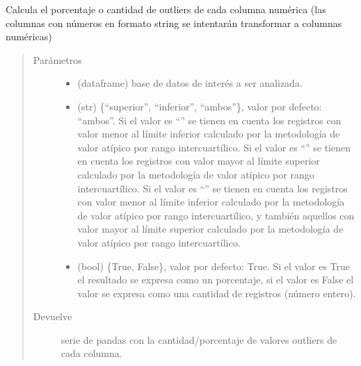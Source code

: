 \documentclass[letterpaper,10pt,openany,spanish]{sphinxmanual}
\begin{document}
\begin{fulllineitems}
\label{\detokenize{datos:datos.extremos}}
Calcula el porcentaje o cantidad de outliers de cada columna numérica (las columnas con números en formato string se intentarán transformar a columnas numéricas)
\begin{quote}\begin{description}
\item[{Parámetros}] \leavevmode\begin{itemize}
\item {} 
 \textendash{} (dataframe) base de datos de interés a ser analizada.

\item {} 
 \textendash{} (str) \{“superior”, “inferior”, “ambos”\}, valor por defecto: “ambos”. Si el valor es “” se tienen en cuenta los registros con valor menor al límite inferior calculado por la metodología de valor atípico por rango intercuartílico. Si el valor es “” se tienen en cuenta los registros con valor mayor al límite superior calculado por la metodología de valor atípico por rango intercuartílico. Si el valor es “” se tienen en cuenta los registros con valor menor al límite inferior calculado por la metodología de valor atípico por rango intercuartílico, y también aquellos con valor mayor al límite superior calculado por la metodología de valor atípico por rango intercuartílico.

\item {} 
 \textendash{} (bool) \{True, False\}, valor por defecto: True. Si el valor es True el resultado se expresa como un porcentaje, si el valor es False el valor se expresa como una cantidad de registros (número entero).

\end{itemize}

\item[{Devuelve}] \leavevmode
serie de pandas con la cantidad/porcentaje de valores outliers de cada columna.

\end{description}\end{quote}

\end{fulllineitems}
\end{document}
